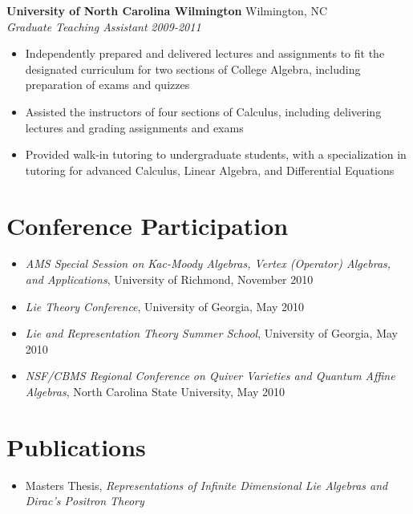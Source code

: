 \documentclass[10pt]{article}
\begin{document}
\noindent
{\bf University of North Carolina Wilmington} \hfill Wilmington, NC\\
{\it Graduate Teaching Assistant} \hfill {\it 2009-2011}

\begin{itemize}
\setlength{\itemsep}{1pt}

\item Independently prepared and delivered lectures and assignments to fit
the designated curriculum for two sections of College Algebra, including
preparation of exams and quizzes

\item Assisted the instructors of four sections of Calculus, including
delivering lectures and grading assignments and exams

\item	Provided walk-in tutoring to undergraduate students, with a
specialization in tutoring for advanced Calculus, Linear Algebra,
and Differential Equations

\end{itemize}



\section*{Conference Participation}

\begin{itemize}
\setlength{\itemsep}{1pt}
\item	{\it AMS Special Session on Kac-Moody Algebras, Vertex (Operator)
Algebras, and Applications}, University of Richmond, November 2010
\item	{\it Lie Theory Conference}, University of Georgia, May 2010
\item	{\it Lie and Representation Theory Summer School}, University of Georgia,
May 2010
\item	{\it NSF/CBMS Regional Conference on Quiver Varieties and Quantum Affine
Algebras}, North Carolina State University, May 2010
\end{itemize}


\section*{Publications}

\begin{itemize}

\item Masters Thesis, {\it Representations of Infinite Dimensional Lie Algebras
and Dirac's Positron Theory}

\end{itemize}
\end{document}
